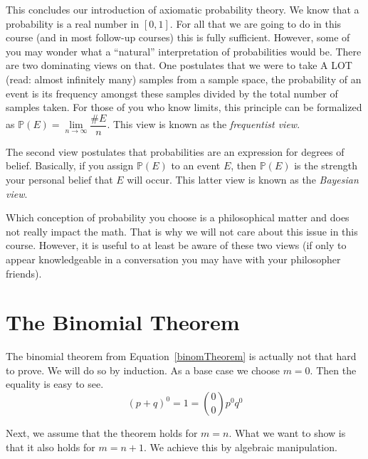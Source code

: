 \documentclass[a4paper,11pt,leqno]{report}
\begin{document}
This concludes our introduction of axiomatic probability theory. We know that a probability is
a real number in $ [0,1] $. For all that we are going to do in this course (and in most follow-up courses)
this is fully sufficient. However, some of you may wonder what a ``natural'' interpretation of probabilities
would be. There are two dominating views on that. One postulates that we were to take A LOT (read: almost
infinitely many) samples from a sample space, the probability of an event is its frequency amongst these
samples divided by the total number of samples taken. For those of you who know limits, this principle can be
formalized as $ \mathbb{P}(E) = \underset{n \rightarrow \infty}{\lim} \dfrac{\#E}{n} $. This view
is known as the \emph{frequentist view}.

The second view postulates that probabilities are an expression for degrees of belief. Basically, 
if you assign $ \mathbb{P}(E) $ to an event $ E $, then $ \mathbb{P}(E) $ is the strength your personal belief that
$ E $ will occur. This latter view is known as the \emph{Bayesian view}.

Which conception of probability you choose is a philosophical matter and does not really impact the math.
That is why we will not care about this issue in this course. However, it is useful to at least be aware
of these two views (if only to appear knowledgeable in a conversation you may have with your philosopher 
friends).


\section{The Binomial Theorem}
The binomial theorem from Equation~\eqref{binomTheorem} is actually not that hard to prove. We will do so by
induction. As a base case we choose $ m = 0 $. Then the equality is easy to see.
\begin{equation}
(p + q)^{0} = 1 = \binom{0}{0}p^{0}q^{0}
\end{equation}

Next, we assume that the theorem holds for $ m = n $. What we want to show is that it also holds for
$ m = n + 1 $. We achieve this by algebraic manipulation.
\end{document}
